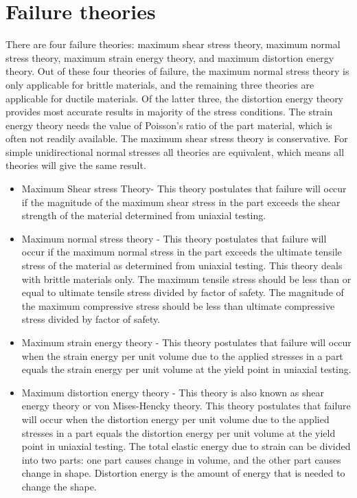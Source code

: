\section{Failure theories}
There are four failure theories: maximum shear stress theory, maximum normal stress theory, maximum strain energy theory, and maximum distortion energy theory. Out of these four theories of failure, the maximum normal stress theory is only applicable for brittle materials, and the remaining three theories are applicable for ductile materials. Of the latter three, the distortion energy theory provides most accurate results in majority of the stress conditions. The strain energy theory needs the value of Poisson’s ratio of the part material, which is often not readily available. The maximum shear stress theory is conservative. For simple unidirectional normal stresses all theories are equivalent, which means all theories will give the same result. \\

\begin{itemize}
	\item Maximum Shear stress Theory- This theory postulates that failure will occur if the magnitude of the maximum shear stress in the part exceeds the shear strength of the material determined from uniaxial testing.
	
	\item Maximum normal stress theory - This theory postulates that failure will occur if the maximum normal stress in the part exceeds the ultimate tensile stress of the material as determined from uniaxial testing. This theory deals with brittle materials only. The maximum tensile stress should be less than or equal to ultimate tensile stress divided by factor of safety. The magnitude of the maximum compressive stress should be less than ultimate compressive stress divided by factor of safety.
	
	\item Maximum strain energy theory - This theory postulates that failure will occur when the strain energy per unit volume due to the applied stresses in a part equals the strain energy per unit volume at the yield point in uniaxial testing.
	
	\item Maximum distortion energy theory - This theory is also known as shear energy theory or von Mises-Hencky theory. This theory postulates that failure will occur when the distortion energy per unit volume due to the applied stresses in a part equals the distortion energy per unit volume at the yield point in uniaxial testing. The total elastic energy due to strain can be divided into two parts: one part causes change in volume, and the other part causes change in shape. Distortion energy is the amount of energy that is needed to change the shape.
\end{itemize}

